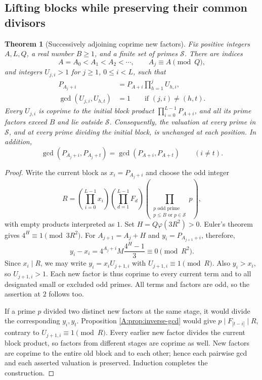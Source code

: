 \documentclass[11pt,a4paper]{article}
\newtheorem{theorem}{Theorem}[section]
\theoremstyle{definition}
\theoremstyle{remark}
\numberwithin{equation}{section}
\begin{document}
\subsection{Lifting blocks while preserving their common divisors}
\begin{theorem}[Successively adjoining coprime new factors]
\label{A:thm:coprime-block-lifting}
Fix positive integers $A,L,Q$, a real number $B\ge1$, and a finite set
of primes $\mathcal S$. There are indices
\[
 A=A_0<A_1<A_2<\cdots,\qquad A_j\equiv A\pmod Q,
\]
and integers $U_{j,i}>1$ for $j\ge1$, $0\le i<L$, such that
\begin{align*}
 P_{A_j+i}&=P_{A+i}\prod_{h=1}^jU_{h,i},\\
 \gcd(U_{j,i},U_{h,t})&=1\qquad\text{if }(j,i)\ne(h,t).
\end{align*}
Every $U_{j,i}$ is coprime to the initial block product
$\prod_{i=0}^{L-1}P_{A+i}$, and all its prime factors exceed $B$ and lie
outside $\mathcal S$. Consequently, the valuation at every prime in
$\mathcal S$, and at every prime dividing the initial block, is unchanged
at each position. In addition,
\[
 \gcd(P_{A_j+i},P_{A_j+t})
 =\gcd(P_{A+i},P_{A+t})\qquad(i\ne t).
\]
\end{theorem}
\begin{proof}
Write the current block as $x_i=P_{A_j+i}$ and choose the odd integer
\[
 R=\left(\prod_{i=0}^{L-1}x_i\right)
   \left(\prod_{d=1}^{L-1}F_d\right)
   \left(\prod_{\substack{p\text{ odd prime}\\p\le B\text{ or }p\in\mathcal S}}p\right),
\]
with empty products interpreted as $1$. Set $H=Q\varphi(3R^2)>0$.
Euler's theorem gives $4^H\equiv1\pmod{3R^2}$. For
$A_{j+1}=A_j+H$ and $y_i=P_{A_{j+1}+i}$, therefore,
\[
 y_i-x_i=4^{A_j+i}M\frac{4^H-1}{3}\equiv0\pmod{R^2}.
\]
Since $x_i\mid R$, we may write $y_i=x_iU_{j+1,i}$ with
$U_{j+1,i}\equiv1\pmod R$. Also $y_i>x_i$, so $U_{j+1,i}>1$.
Each new factor is thus coprime to every current term and to all
designated small or excluded odd primes. All terms and factors are odd,
so the assertion at $2$ follows too.

If a prime $p$ divided two distinct new factors at the same stage, it
would divide the corresponding $y_i,y_t$. Proposition
\ref{A:prop:inverse-gcd} would give $p\mid F_{|t-i|}\mid R$, contrary to
$U_{j+1,i}\equiv1\pmod R$. Every earlier new factor divides the current
block product, so factors from different stages are coprime as well.
New factors are coprime to the entire old block and to each other;
hence each pairwise gcd and each asserted valuation is preserved.
Induction completes the construction.
\end{proof}
\end{document}
